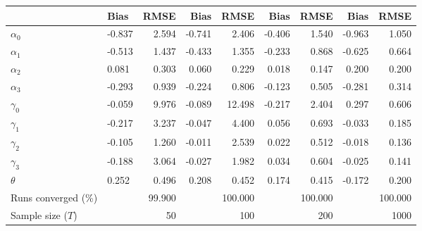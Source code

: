 
\begin{tabular}[t]{llrrrrrrr}
\toprule
  & Bias & RMSE & Bias & RMSE & Bias & RMSE & Bias & RMSE\\
\midrule
$\alpha_{0}$ & -0.837 & 2.594 & -0.741 & 2.406 & -0.406 & 1.540 & -0.963 & 1.050\\
$\alpha_{1}$ & -0.513 & 1.437 & -0.433 & 1.355 & -0.233 & 0.868 & -0.625 & 0.664\\
$\alpha_{2}$ & 0.081 & 0.303 & 0.060 & 0.229 & 0.018 & 0.147 & 0.200 & 0.200\\
$\alpha_{3}$ & -0.293 & 0.939 & -0.224 & 0.806 & -0.123 & 0.505 & -0.281 & 0.314\\
$\gamma_{0}$ & -0.059 & 9.976 & -0.089 & 12.498 & -0.217 & 2.404 & 0.297 & 0.606\\
$\gamma_{1}$ & -0.217 & 3.237 & -0.047 & 4.400 & 0.056 & 0.693 & -0.033 & 0.185\\
$\gamma_{2}$ & -0.105 & 1.260 & -0.011 & 2.539 & 0.022 & 0.512 & -0.018 & 0.136\\
$\gamma_{3}$ & -0.188 & 3.064 & -0.027 & 1.982 & 0.034 & 0.604 & -0.025 & 0.141\\
$\theta$ & 0.252 & 0.496 & 0.208 & 0.452 & 0.174 & 0.415 & -0.172 & 0.200\\
Runs converged (\%) &  & 99.900 &  & 100.000 &  & 100.000 &  & 100.000\\
Sample size ($T$) &  & 50 &  & 100 &  & 200 &  & 1000\\
\bottomrule
\end{tabular}
